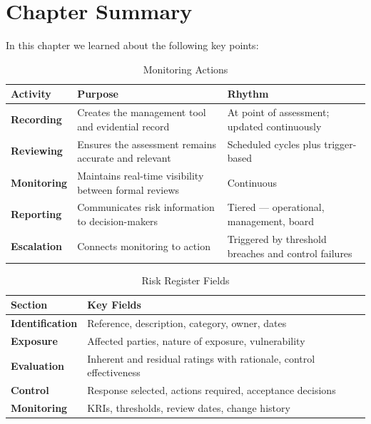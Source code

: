 \section{Chapter Summary}
In this chapter we learned about the following key points:
\begin{table}[H]
  \centering
  \renewcommand{\arraystretch}{1.5}
  \begin{tabularx}{\textwidth}{ | >{\raggedright\arraybackslash}p{} 
								| >{\raggedright\arraybackslash}p{} 
                                | >{\raggedright\arraybackslash}X | }
    \hline
    \textbf{Activity} & \textbf{Purpose} & \textbf{Rhythm} \\
    \hline
    \textbf{Recording} & Creates the management tool and evidential record & At point of assessment; updated continuously\\
    \hline
    \textbf{Reviewing} & Ensures the assessment remains accurate and relevant & Scheduled cycles plus trigger-based\\
    \hline
    \textbf{Monitoring} & Maintains real-time visibility between formal reviews & Continuous\\
    \hline
    \textbf{Reporting} & Communicates risk information to decision-makers & Tiered — operational, management, board\\
    \hline
    \textbf{Escalation} & Connects monitoring to action & Triggered by threshold breaches and control failures\\
    \hline
  \end{tabularx}
  \caption{Monitoring Actions}
\end{table}

\begin{table}[H]
  \centering
  \renewcommand{\arraystretch}{1.5}
  \begin{tabularx}{\textwidth}{ | >{\raggedright\arraybackslash}p{} 
                                | >{\raggedright\arraybackslash}X | }
    \hline
    \textbf{Section} & \textbf{Key Fields} \\
    \hline
    \textbf{Identification} & Reference, description, category, owner, dates\\
    \hline
    \textbf{Exposure} & Affected parties, nature of exposure, vulnerability\\
    \hline
    \textbf{Evaluation} & Inherent and residual ratings with rationale, control effectiveness\\
    \hline
    \textbf{Control} & Response selected, actions required, acceptance decisions\\
    \hline
    \textbf{Monitoring} & KRIs, thresholds, review dates, change history\\
    \hline
  \end{tabularx}
  \caption{Risk Register Fields}
\end{table}

